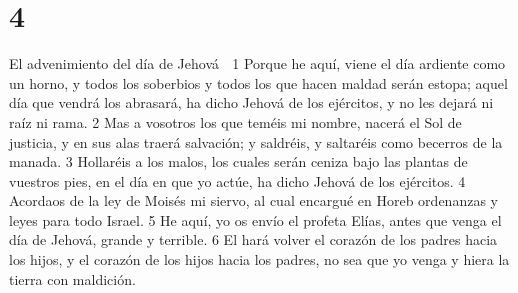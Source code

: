 \chapter{4}

El advenimiento del día de Jehová

1 Porque he aquí, viene el día ardiente como un horno, y todos los soberbios y todos los que hacen maldad serán estopa; aquel día que vendrá los abrasará, ha dicho Jehová de los ejércitos, y no les dejará ni raíz ni rama.
2 Mas a vosotros los que teméis mi nombre, nacerá el Sol de justicia, y en sus alas traerá salvación; y saldréis, y saltaréis como becerros de la manada.
3 Hollaréis a los malos, los cuales serán ceniza bajo las plantas de vuestros pies, en el día en que yo actúe, ha dicho Jehová de los ejércitos. 
4 Acordaos de la ley de Moisés mi siervo, al cual encargué en Horeb ordenanzas y leyes para todo Israel.
5 He aquí, yo os envío el profeta Elías, antes que venga el día de Jehová, grande y terrible.
6 El hará volver el corazón de los padres hacia los hijos, y el corazón de los hijos hacia los padres, no sea que yo venga y hiera la tierra con maldición.

